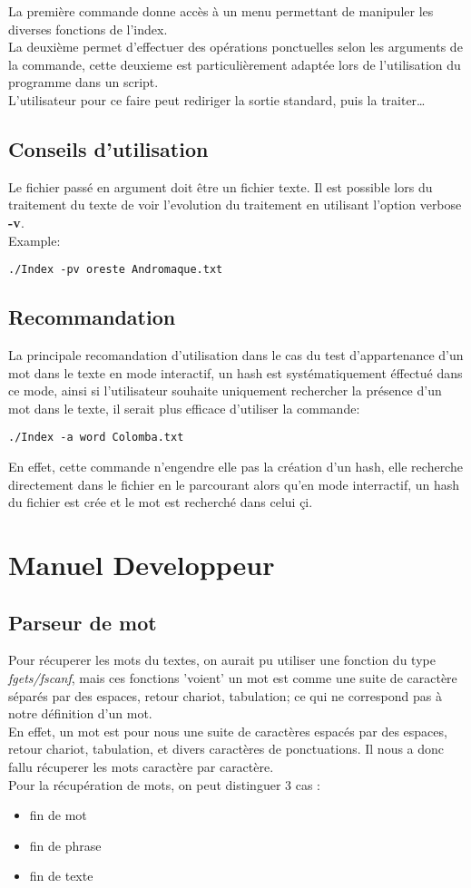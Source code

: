 \documentclass[french, 12pt, titlepage]{article}
\begin{document}
La première commande donne accès à un menu permettant de manipuler les
diverses fonctions de l'index.\\
La deuxième permet d'effectuer des opérations ponctuelles selon les
arguments de la commande, cette deuxieme est particulièrement adaptée
lors de l'utilisation du programme dans un script.\\
L'utilisateur pour ce faire peut rediriger la sortie standard, puis la
traiter\dots

\subsection{Conseils d'utilisation}
Le fichier passé en argument doit être un fichier texte. Il est possible lors du
traitement du texte de voir l'evolution du traitement en utilisant l'option
verbose \textbf{-v}.\\
Example:
\begin{lstlisting}
./Index -pv oreste Andromaque.txt
\end{lstlisting}

\subsection{Recommandation}
La principale recomandation d'utilisation dans le cas du test d'appartenance
 d'un mot dans le texte en mode interactif, un hash est
 systématiquement éffectué dans ce mode, ainsi si l'utilisateur
 souhaite uniquement rechercher la présence d'un mot dans le texte, il
 serait plus efficace d'utiliser la commande:
\begin{lstlisting}
./Index -a word Colomba.txt
\end{lstlisting}
En effet, cette commande n'engendre elle pas la création d'un hash,
elle recherche directement dans le fichier en le parcourant alors
qu'en mode interractif, un hash du fichier est crée et le mot est
recherché dans celui çi.

\newpage
\section{Manuel Developpeur}
\subsection{Parseur de mot}
Pour récuperer les mots du textes, on aurait pu utiliser une fonction
du type \textit{fgets/fscanf}, mais ces fonctions 'voient' un
mot est comme une suite de caractère séparés par des espaces, retour
chariot, tabulation; ce qui ne correspond pas à notre définition d'un mot.\\
En effet, un mot est pour nous une suite de caractères espacés par des
espaces, retour chariot, tabulation, et divers caractères de
ponctuations. Il nous a donc fallu récuperer les mots caractère
par caractère.\\
Pour la récupération de mots, on peut distinguer 3 cas :
\begin{itemize}
\item fin de mot
\item fin de phrase
\item fin de texte
\end{itemize}
\end{document}
